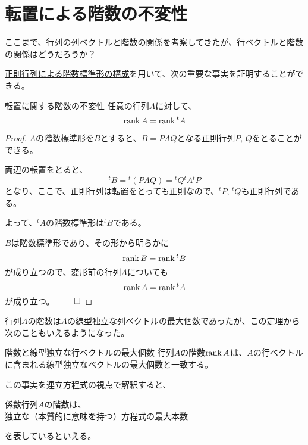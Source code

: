 \documentclass[../../../topic_linear-algebra]{subfiles}
\begin{document}
\sectionline
\section{転置による階数の不変性}

ここまで、行列の列ベクトルと階数の関係を考察してきたが、行ベクトルと階数の関係はどうだろうか？

\br

\hyperref[thm:rank-normal-form-by-regular-matrices]{正則行列による階数標準形の構成}を用いて、次の重要な事実を証明することができる。

\begin{theorem*}{転置に関する階数の不変性}
  任意の行列$A$に対して、
  \begin{equation*}
    \rank A = \rank {}^t A
  \end{equation*}
\end{theorem*}

\begin{proof}
  $A$の階数標準形を$B$とすると、$B=PAQ$となる正則行列$P,\,Q$をとることができる。

  両辺の転置をとると、
  \begin{equation*}
    {}^t B = {}^t (PAQ) = {}^t Q {}^t A {}^t P
  \end{equation*}
  となり、ここで、\hyperref[thm:transpose-of-invertible]{正則行列は転置をとっても正則}なので、${}^t P,\,{}^t Q$も正則行列である。

  よって、${}^tA$の階数標準形は${}^t B$である。

  \br

  $B$は階数標準形であり、その形から明らかに
  \begin{equation*}
    \rank B = \rank {}^t B
  \end{equation*}
  が成り立つので、変形前の行列$A$についても
  \begin{equation*}
    \rank A = \rank {}^t A
  \end{equation*}
  が成り立つ。 $\qed$
\end{proof}

\br

\hyperref[thm:rank-equals-max-indep-cols]{行列$A$の階数は$A$の線型独立な列ベクトルの最大個数}であったが、この定理から次のこともいえるようになった。

\begin{theorem*}{階数と線型独立な行ベクトルの最大個数}
  行列$A$の階数$\rank A$は、$A$の行ベクトルに含まれる線型独立なベクトルの最大個数と一致する。
\end{theorem*}

\br

この事実を連立方程式の視点で解釈すると、
\begin{emphabox}
  \begin{spacebox}
    \begin{center}
      係数行列$A$の階数は、\\
      独立な（本質的に意味を持つ）方程式の最大本数
    \end{center}
  \end{spacebox}
\end{emphabox}
を表しているといえる。
\end{document}
